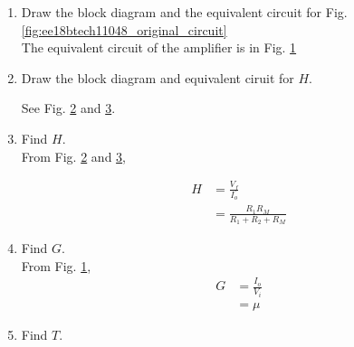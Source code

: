 \begin{enumerate}[label=\arabic*.,ref=\theenumi]

\item Draw the block diagram and the equivalent circuit for Fig. \ref{fig:ee18btech11048_original_circuit}\\
\solution
The equivalent circuit of the amplifier is in Fig. \ref{fig:ee18btech11048_ss_circuit}

\begin{figure}[!ht]
	\begin{center}
		\resizebox{\columnwidth}{!}{}
	\end{center}
\caption{}
\label{fig:ee18btech11048_ss_circuit}
\end{figure}


\item Draw the block diagram and equivalent ciruit for $H$.
\\
\renewcommand{\thefigure}{\theenumi.\arabic{figure}}


\begin{figure}[!ht]
	\begin{center}
		\resizebox{\columnwidth}{!}{}
	\end{center}
\caption{}
\label{fig:ee18btech11048pic3}
\end{figure}

\begin{figure}[!ht]
	\begin{center}
		\resizebox{\columnwidth}{!}{}
	\end{center}
\caption{}
\label{fig:ee18btech11048h}
\end{figure}

\solution See Fig. \ref{fig:ee18btech11048pic3} and \ref{fig:ee18btech11048h}.
\item Find  $H$.
\\
\solution From Fig.  \ref{fig:ee18btech11048pic3} and \ref{fig:ee18btech11048h},

\begin{align}
H &= \frac{V_{f}}{I_{o}} 
\\
&= \frac{R_1R_M}{R_1+R_2+R_M}
\label{eq:ee18btech11048_H}
\end{align}
%
\item Find  $G$.
\\
\solution From Fig. \ref{fig:ee18btech11048_ss_circuit},
\begin{align}
G &= \frac{I_{o}}{V_{i}} \label{eq:ee18btech11048_G}\\
&= \mu
\end{align}
\item  Find $T$.
\\
\begin{figure}[!ht]
	\begin{center}
		\resizebox{\columnwidth}{!}{}
	\end{center}
\caption{}
\label{fig:block}
\end{figure}


\end{enumerate}
